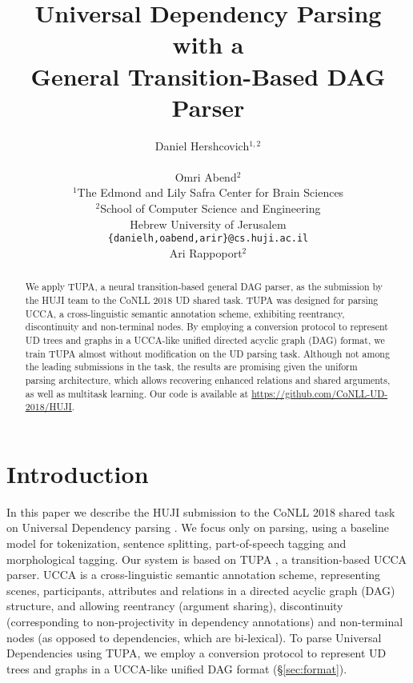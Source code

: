 \documentclass[11pt,a4paper]{article}
\title{Universal Dependency Parsing with a \\ General Transition-Based DAG Parser}
\author{Daniel Hershcovich$^{1,2}$ \\
  \\\And
  Omri Abend$^2$ \\
  $^1$The Edmond and Lily Safra Center for Brain Sciences \\
  $^2$School of Computer Science and Engineering \\
  Hebrew University of Jerusalem \\
  \texttt{\{danielh,oabend,arir\}@cs.huji.ac.il}
  \\\And
  Ari Rappoport$^2$
}
\date{}
\begin{document}
\maketitle
\begin{abstract}
  We apply TUPA, a neural transition-based general DAG parser,
  as the submission by the HUJI team to the CoNLL 2018 UD shared task.
  TUPA was designed for parsing UCCA, a cross-linguistic
  semantic annotation scheme, exhibiting
  reentrancy, discontinuity and non-terminal nodes.
  By employing a conversion protocol to represent
  UD trees and graphs in a UCCA-like unified directed acyclic graph (DAG) format,
  we train TUPA almost without modification on the UD parsing task.
  Although not among the leading submissions in the task,
  the results are promising given the uniform parsing architecture,
  which allows recovering enhanced relations and shared arguments,
  as well as multitask learning.
  Our code is available at \url{https://github.com/CoNLL-UD-2018/HUJI}.
\end{abstract}

\section{Introduction}\label{sec:introduction}

In this paper we describe the HUJI submission to the CoNLL 2018 shared task
on Universal Dependency parsing \cite{udst:overview2018}.
We focus only on parsing, using a baseline model \cite[UDPipe 1.2;][]{udpipe,udpipe:2017}
for tokenization, sentence splitting, part-of-speech tagging and morphological tagging.
Our system is based on TUPA \cite[see \S\ref{sec:model}]{hershcovich2017a,hershcovich2018multitask},
a transition-based UCCA parser.
UCCA \cite[Universal Conceptual Cognitive Annotation;][]{abend2013universal} is a
cross-linguistic semantic annotation scheme, representing scenes, participants,
attributes and relations in a directed acyclic graph (DAG) structure,
and allowing reentrancy (argument sharing),
discontinuity (corresponding to non-projectivity in dependency annotations)
and non-terminal nodes (as opposed to dependencies, which are bi-lexical).
To parse Universal Dependencies \cite{nivre2016universal}
using TUPA, we employ a conversion protocol to represent
UD trees and graphs in a UCCA-like unified DAG format (\S\ref{sec:format}).
\end{document}
